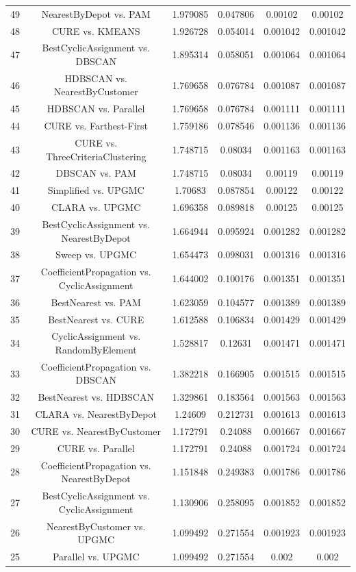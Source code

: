 \documentclass[a4paper,10pt]{article}
\begin{document}
\begin{landscape}
\begin{table}[!htp]
\begin{tabular}{cccccc}
49&NearestByDepot vs. PAM&1.979085&0.047806&0.00102&0.00102\\
48&CURE vs. KMEANS&1.926728&0.054014&0.001042&0.001042\\
47&BestCyclicAssignment vs. DBSCAN&1.895314&0.058051&0.001064&0.001064\\
46&HDBSCAN vs. NearestByCustomer&1.769658&0.076784&0.001087&0.001087\\
45&HDBSCAN vs. Parallel&1.769658&0.076784&0.001111&0.001111\\
44&CURE vs. Farthest-First&1.759186&0.078546&0.001136&0.001136\\
43&CURE vs. ThreeCriteriaClustering&1.748715&0.08034&0.001163&0.001163\\
42&DBSCAN vs. PAM&1.748715&0.08034&0.00119&0.00119\\
41&Simplified vs. UPGMC&1.70683&0.087854&0.00122&0.00122\\
40&CLARA vs. UPGMC&1.696358&0.089818&0.00125&0.00125\\
39&BestCyclicAssignment vs. NearestByDepot&1.664944&0.095924&0.001282&0.001282\\
38&Sweep vs. UPGMC&1.654473&0.098031&0.001316&0.001316\\
37&CoefficientPropagation vs. CyclicAssignment&1.644002&0.100176&0.001351&0.001351\\
36&BestNearest vs. PAM&1.623059&0.104577&0.001389&0.001389\\
35&BestNearest vs. CURE&1.612588&0.106834&0.001429&0.001429\\
34&CyclicAssignment vs. RandomByElement&1.528817&0.12631&0.001471&0.001471\\
33&CoefficientPropagation vs. DBSCAN&1.382218&0.166905&0.001515&0.001515\\
32&BestNearest vs. HDBSCAN&1.329861&0.183564&0.001563&0.001563\\
31&CLARA vs. NearestByDepot&1.24609&0.212731&0.001613&0.001613\\
30&CURE vs. NearestByCustomer&1.172791&0.24088&0.001667&0.001667\\
29&CURE vs. Parallel&1.172791&0.24088&0.001724&0.001724\\
28&CoefficientPropagation vs. NearestByDepot&1.151848&0.249383&0.001786&0.001786\\
27&BestCyclicAssignment vs. CyclicAssignment&1.130906&0.258095&0.001852&0.001852\\
26&NearestByCustomer vs. UPGMC&1.099492&0.271554&0.001923&0.001923\\
25&Parallel vs. UPGMC&1.099492&0.271554&0.002&0.002\\

\end{tabular}
\end{table}
\end{landscape}
\end{document}
